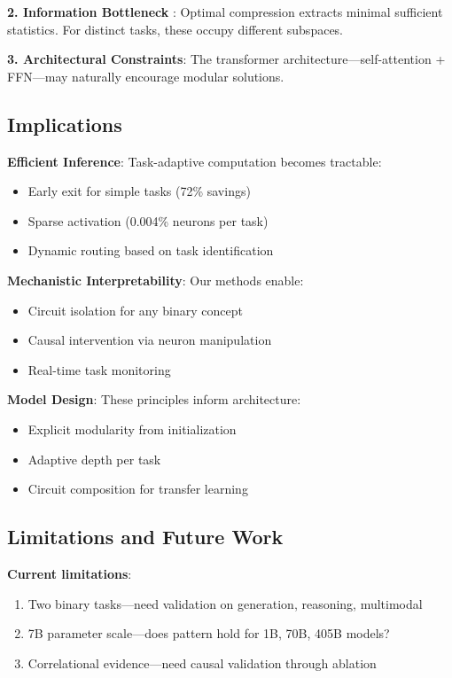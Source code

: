 \documentclass{article}
\begin{document}
\textbf{2. Information Bottleneck} \cite{tishby2015deep}: Optimal compression extracts minimal sufficient statistics. For distinct tasks, these occupy different subspaces.

\textbf{3. Architectural Constraints}: The transformer architecture—self-attention + FFN—may naturally encourage modular solutions.

\subsection{Implications}

\textbf{Efficient Inference}: Task-adaptive computation becomes tractable:
\begin{itemize}
    \item Early exit for simple tasks (72\% savings)
    \item Sparse activation (0.004\% neurons per task)
    \item Dynamic routing based on task identification
\end{itemize}

\textbf{Mechanistic Interpretability}: Our methods enable:
\begin{itemize}
    \item Circuit isolation for any binary concept
    \item Causal intervention via neuron manipulation
    \item Real-time task monitoring
\end{itemize}

\textbf{Model Design}: These principles inform architecture:
\begin{itemize}
    \item Explicit modularity from initialization
    \item Adaptive depth per task
    \item Circuit composition for transfer learning
\end{itemize}

\subsection{Limitations and Future Work}

\textbf{Current limitations}:
\begin{enumerate}
    \item Two binary tasks—need validation on generation, reasoning, multimodal
    \item 7B parameter scale—does pattern hold for 1B, 70B, 405B models?
    \item Correlational evidence—need causal validation through ablation
\end{enumerate}
\end{document}
